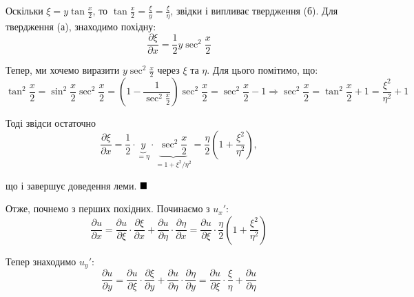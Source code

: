 \documentclass{hw_template}
\begin{document}
Оскільки $\xi = y \tan \frac{x}{2}$, то $\tan \frac{x}{2} = \frac{\xi}{y} = \frac{\xi}{\eta}$, звідки і випливає твердження (б). Для твердження (а), знаходимо похідну:
\begin{equation*}
    \frac{\partial \xi}{\partial x} = \frac{1}{2}y \sec^2 \frac{x}{2}
\end{equation*}

Тепер, ми хочемо виразити $y \sec^2 \frac{x}{2}$ через $\xi$ та $\eta$. Для цього помітимо, що:
\begin{equation*}
    \tan^2 \frac{x}{2} = \sin^2 \frac{x}{2}\sec^2 \frac{x}{2} = \left(1 - \frac{1}{\sec^2 \frac{x}{2}}\right)\sec^2 \frac{x}{2} = \sec^2 \frac{x}{2} - 1 \Rightarrow \sec^2 \frac{x}{2} = \tan^2 \frac{x}{2} + 1 = \frac{\xi^2}{\eta^2} + 1
\end{equation*}

Тоді звідси остаточно
\begin{equation*}
    \frac{\partial \xi}{\partial x} = \frac{1}{2}\cdot\underbrace{y}_{=\eta} \cdot \underbrace{\sec^2 \frac{x}{2}}_{=1+\xi^2/\eta^2} = \frac{\eta}{2}\left(1+\frac{\xi^2}{\eta^2}\right),
\end{equation*}

що і завершує доведення леми. $\hfill\blacksquare$

\vspace{10px}

Отже, почнемо з перших похідних. Починаємо з $u_x'$:
\begin{equation*}
    \frac{\partial u}{\partial x} = \frac{\partial u}{\partial \xi} \cdot \frac{\partial \xi}{\partial x} + \frac{\partial u}{\partial \eta} \cdot \frac{\partial \eta}{\partial x} = \boxed{\frac{\partial u}{\partial \xi} \cdot \frac{\eta}{2}\left(1 + \frac{\xi^2}{\eta^2}\right)}
\end{equation*}

Тепер знаходимо $u_y'$:
\begin{equation*}
    \frac{\partial u}{\partial y} = \frac{\partial u}{\partial \xi} \cdot \frac{\partial \xi}{\partial y} + \frac{\partial u}{\partial \eta} \cdot \frac{\partial \eta}{\partial y} = \boxed{\frac{\partial u}{\partial \xi} \cdot \frac{\xi}{\eta} + \frac{\partial u}{\partial \eta}}
\end{equation*}
\end{document}
